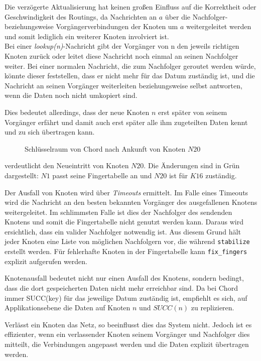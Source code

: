 Die verzögerte Aktualisierung hat keinen großen Einfluss auf die Korrektheit oder Geschwindigkeit des Routings, da Nachrichten an $a$ über die Nachfolger- beziehungsweise Vorgängerverbindungen der Knoten um $a$ weitergeleitet werden und somit lediglich ein weiterer Knoten involviert ist.\\
Bei einer \emph{lookup(n)}-Nachricht gibt der Vorgänger von n den jeweils richtigen Knoten zurück oder leitet diese Nachricht noch einmal an seinen Nachfolger weiter. Bei einer normalen Nachricht, die zum Nachfolger geroutet werden würde, könnte dieser feststellen, dass er nicht mehr für das Datum zuständig ist, und die Nachricht an seinen Vorgänger weiterleiten beziehungsweise selbst antworten, wenn die Daten noch nicht umkopiert sind. 

Dies bedeutet allerdings, dass der neue Knoten $n$ erst später von seinem Vorgänger erfährt und damit auch erst später alle ihm zugeteilten Daten kennt und zu sich übertragen kann.

\begin{figure}[htbp]
\centering
{}
\caption{Schlüsselraum von Chord nach Ankunft von Knoten $N20$}
\label{fig:chord_new_node}
\end{figure}

 verdeutlicht den Neueintritt von Knoten $N20$. Die Änderungen sind in Grün dargestellt: $N1$ passt seine Fingertabelle an und $N20$ ist für $K16$ zuständig.

Der Ausfall von Knoten wird über \emph{Timeouts} ermittelt. Im Falle eines Timeouts wird die Nachricht an den besten bekannten Vorgänger des ausgefallenen Knotens weitergeleitet. Im schlimmsten Falle ist dies der Nachfolger des sendenden Knotens und somit die Fingertabelle nicht genutzt werden kann. Daraus wird ersichtlich, dass ein valider Nachfolger notwendig ist. Aus diesem Grund hält jeder Knoten eine Liste von möglichen Nachfolgern vor, die während \texttt{stabilize} erstellt werden. Für fehlerhafte Knoten in der Fingertabelle kann \texttt{fix\_fingers} explizit aufgerufen werden.

Knotenausfall bedeutet nicht nur einen Ausfall des Knotens, sondern bedingt, dass die dort gespeicherten Daten nicht mehr erreichbar sind. Da bei Chord immer SUCC(key) für das jeweilige Datum zuständig ist, empfiehlt es sich, auf Applikationsebene die Daten auf Knoten $n$ und $SUCC(n)$ zu replizieren.

Verlässt ein Knoten das Netz, so beeinflusst dies das System nicht. Jedoch ist es effizienter, wenn ein verlassender Knoten seinem Vorgänger und Nachfolger dies mitteilt, die Verbindungen angepasst werden und die Daten explizit übertragen werden.
